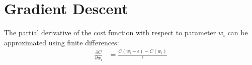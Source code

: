 \documentclass{article}
\begin{document}
\section{Gradient Descent}
The partial derivative of the cost function with respect to parameter $w_i$ can be approximated using finite differences:
\begin{align}
  \frac{\partial C}{\partial w_i} &= \frac{C(w_i + \epsilon) - C(w_i)} {\epsilon}
\end{align}
\end{document}
